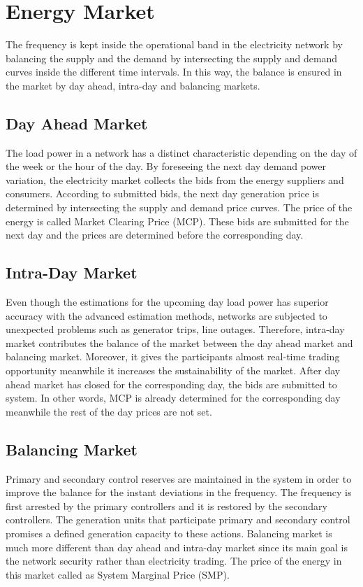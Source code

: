 \section{Energy Market}
The frequency is kept inside the operational band in the electricity network by balancing the supply and the demand by intersecting the supply and demand curves inside the different time intervals. In this way, the balance is ensured in the market by day ahead, intra-day and balancing markets. 
\subsection{Day Ahead Market}
The load power in a network has a distinct characteristic depending on the day of the week or the hour of the day. By foreseeing the next day demand power variation, the electricity market collects the bids from the energy suppliers and consumers. According to submitted bids, the next day generation price is determined by intersecting the supply and demand price curves. The price of the energy is called Market Clearing Price (MCP). These bids are submitted for the next day and the prices are determined before the corresponding day.
\subsection{Intra-Day Market}
Even though the estimations for the upcoming day load power has superior accuracy with the advanced estimation methods, networks are subjected to unexpected problems such as generator trips, line outages. Therefore, intra-day market contributes the balance of the market between the day ahead market and balancing market. Moreover, it gives the participants almost real-time trading opportunity meanwhile it increases the sustainability of the market. After day ahead market has closed for the corresponding day, the bids are submitted to system. In other words, MCP is already determined for the corresponding day meanwhile the rest of the day prices are not set. 
\subsection{Balancing Market}
Primary and secondary control reserves are maintained in the system in order to improve the balance for the instant deviations in the frequency. The frequency is first arrested by the primary controllers and it is restored by the secondary controllers. The generation units that participate primary and secondary control promises a defined generation capacity to these actions. Balancing market is much more different than day ahead and intra-day market since its main goal is the network security rather than electricity trading. The price of the energy in this market called as System Marginal Price (SMP).

